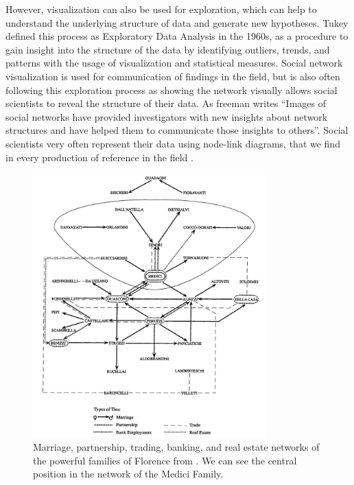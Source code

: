 However, visualization can also be used for exploration, which can help to understand the underlying structure of data and generate new hypotheses.
Tukey defined this process as Exploratory Data Analysis in the 1960s\cite{tukeyExploratoryDataAnalysis1977}, as a procedure to gain insight into the structure of the data by identifying outliers, trends, and patterns with the usage of visualization and statistical measures.
Social network visualization is used for communication of findings in the field, but is also often following this exploration process as showing the network visually allows social scientists to reveal the structure of their data.
As freeman writes ``Images of social networks have provided investigators with new insights about network structures and have helped them to communicate those insights to others''\cite{freemanVisualizingSocialNetworks2000}.
Social scientists very often represent their data using node-link diagrams, that we find in every production of reference in the field \cite{wassermanSocialNetworkAnalysis1994, tabassumSocialNetworkAnalysis2018, lazegaReseaux}.

\begin{figure}[!ht]
    \centering %
    \includegraphics[width=0.8\textwidth]{static/figures/RelatedWork/padgett-Medicis.png}
    \caption{Marriage, partnership, trading, banking, and real estate networks of the powerful families of Florence from \cite{padgettRobustActionRise1993}. We can see the central position in the network of the Medici Family.}
    \label{fig:padgett-medicis}
\end{figure}

